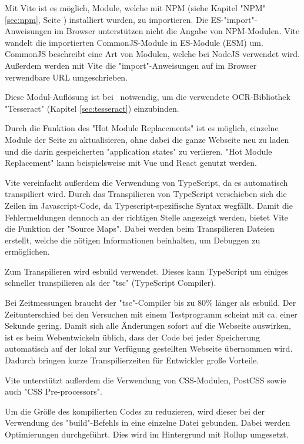 
\label{sec:npm-dependency-resolving}

Mit Vite ist es möglich, Module, welche mit NPM (siehe Kapitel "NPM" \ref{sec:npm}, Seite \pageref{sec:npm}) installiert wurden, zu importieren. 
Die ES-"import"-Anweisungen im Browser unterstützen nicht die Angabe von NPM-Modulen. Vite wandelt die importierten CommonJS-Module in ES-Module (ESM) um. CommonJS beschreibt eine Art von Modulen, welche bei NodeJS verwendet wird. Außerdem werden mit Vite die "import"-Anweisungen auf im Browser verwendbare URL umgeschrieben. \cite{ViteFeatures}


Diese Modul-Auflösung ist bei \ZELIA\ notwendig, um die verwendete OCR-Bibliothek "Tesseract" (Kapitel \ref{sec:tesseract}) einzubinden. 

\label{sec:hot-module-replacement}

Durch die Funktion des "Hot Module Replacements" ist es möglich, einzelne Module der Seite zu aktualisieren, ohne dabei die ganze Webseite neu zu laden und die darin gespeicherten "application states" zu verlieren. "Hot Module Replacement" kann beispielsweise mit Vue und React genutzt werden. \cite{ViteFeatures}
  
 \label{sec:typescript-vite}

Vite vereinfacht außerdem die Verwendung von TypeScript, da es automatisch transpiliert wird. 
Durch das Transpilieren von TypeScript verschieben sich die Zeilen im Javascript-Code, da Typescript-spezifische Syntax wegfällt. 
Damit die Fehler\-meldungen dennoch an der richtigen Stelle angezeigt werden, bietet Vite die Funktion der "Source Maps". 
Dabei werden beim Transpilieren Dateien erstellt, welche die nötigen Informationen beinhalten, um Debuggen zu ermöglichen.

Zum Transpilieren wird esbuild \cite{esbuild} verwendet. Dieses kann TypeScript um einiges schneller transpilieren als der "tsc" (TypeScript Compiler). \cite{ViteFeatures}

Bei Zeitmessungen braucht der "tsc"-Compiler bis zu 80\% länger als esbuild. Der Zeitunterschied bei den Versuchen mit einem Testprogramm scheint mit ca. einer Sekunde gering. 
Damit sich alle Änderungen sofort auf die Webseite auswirken, ist es beim Web\-entwickeln üblich, dass der Code bei jeder Speicherung automatisch auf der lokal zur Verfügung gestellten Webseite übernommen wird. Dadurch bringen kurze Transpilierzeiten für Entwickler große Vorteile. 

\label{sec:css-vite}

Vite unterstützt außerdem die Verwendung von CSS-Modulen, PostCSS sowie auch "CSS Pre-processors". \cite{ViteFeatures}

\label{sec:bundling-vite}

Um die Größe des kompilierten Codes zu reduzieren, wird dieser bei der Verwendung des "build"-Befehls in eine einzelne Datei gebunden. 
Dabei werden Optimierungen durchgeführt. Dies wird im Hintergrund mit Rollup \cite{Rollup} umgesetzt. 
